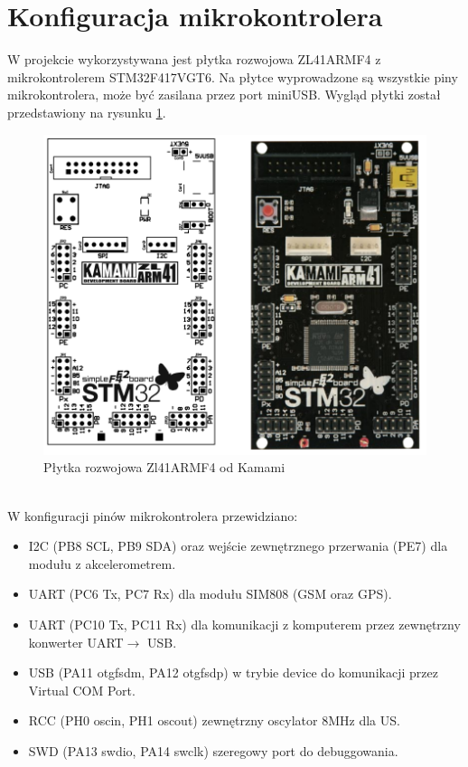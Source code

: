 \documentclass[10pt, a4paper]{article}
\begin{document}
\section{Konfiguracja mikrokontrolera}
W projekcie wykorzystywana jest płytka rozwojowa ZL41ARMF4 z mikrokontrolerem STM32F417VGT6. Na płytce wyprowadzone są wszystkie piny mikrokontrolera, może być zasilana przez port miniUSB. Wygląd płytki został przedstawiony na rysunku \ref{fig:uC}.
\begin{figure}[!htb]
\centering
\includegraphics[height=0.43\textheight]{./uC.PNG}
\caption{Płytka rozwojowa Zl41ARMF4 od Kamami \label{fig:uC}}
\end{figure}\\
W konfiguracji pinów mikrokontrolera przewidziano:
\begin{itemize}
\item I2C (PB8 SCL, PB9 SDA) oraz wejście zewnętrznego przerwania (PE7) dla modułu z akcelerometrem.
\item UART (PC6 Tx, PC7 Rx) dla modułu SIM808 (GSM oraz GPS).
\item UART (PC10 Tx, PC11 Rx) dla komunikacji z komputerem przez zewnętrzny konwerter UART$\rightarrow$ USB.
\item USB (PA11 otg\textunderscore fs\textunderscore dm, PA12 otg\textunderscore fs\textunderscore dp) w trybie device do komunikacji przez Virtual COM Port.
\item RCC (PH0 osc\textunderscore in, PH1 osc\textunderscore out) zewnętrzny oscylator 8MHz dla US.
\item SWD (PA13 swdio, PA14 swclk) szeregowy port do debuggowania.
\end{itemize}
\end{document}
